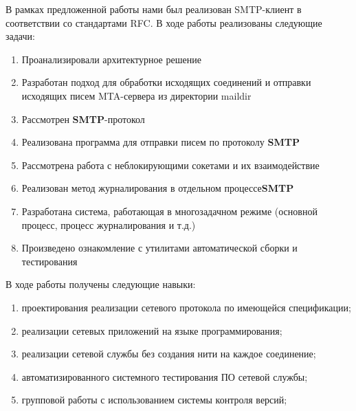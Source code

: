 \documentclass[a4paper,12pt]{report}
\begin{document}
В рамках предложенной работы нами был реализован SMTP-клиент в соответствии со стандартами RFC. В ходе работы реализованы следующие задачи: \\
\begin{enumerate}
	\item Проанализировали архитектурное решение
    \item Разработан подход для обработки исходящих соединений и отправки исходящих писем MTA-сервера из директории maildir
    \item Рассмотрен \textbf{SMTP}-протокол
    \item Реализована программа для отправки писем по протоколу \textbf{SMTP}
    \item Рассмотрена работа с неблокирующими сокетами и их взаимодействие
    \item Реализован метод журналирования в отдельном процессе\textbf{SMTP}
    \item Разработана система, работающая в многозадачном режиме (основной процесс, процесс журналирования и т.д.)
    \item Произведено ознакомление с утилитами автоматической сборки и тестирования
\end{enumerate}
В ходе работы получены следующие навыки: \\
\begin{enumerate}
\item проектирования реализации сетевого протокола по имеющейся спецификации;
\item реализации сетевых приложений на языке программирования;
\item реализации сетевой службы без создания нити на каждое соединение;
\item автоматизированного системного тестирования ПО сетевой службы;
\item групповой работы с использованием системы контроля версий;
\end{enumerate}
\end{document}
